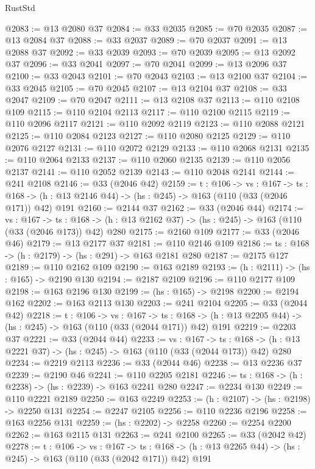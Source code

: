 \begin{lexlean}{RustStd}
\begin{coremodule}
@2083 := @13 @2080 @37
@2084 := @33 @2035
@2085 := @70 @2035
@2087 := @13 @2084 @37
@2088 := @33 @2037
@2089 := @70 @2037
@2091 := @13 @2088 @37
@2092 := @33 @2039
@2093 := @70 @2039
@2095 := @13 @2092 @37
@2096 := @33 @2041
@2097 := @70 @2041
@2099 := @13 @2096 @37
@2100 := @33 @2043
@2101 := @70 @2043
@2103 := @13 @2100 @37
@2104 := @33 @2045
@2105 := @70 @2045
@2107 := @13 @2104 @37
@2108 := @33 @2047
@2109 := @70 @2047
@2111 := @13 @2108 @37
@2113 := @110 @2108 @109
@2115 := @110 @2104 @2113
@2117 := @110 @2100 @2115
@2119 := @110 @2096 @2117
@2121 := @110 @2092 @2119
@2123 := @110 @2088 @2121
@2125 := @110 @2084 @2123
@2127 := @110 @2080 @2125
@2129 := @110 @2076 @2127
@2131 := @110 @2072 @2129
@2133 := @110 @2068 @2131
@2135 := @110 @2064 @2133
@2137 := @110 @2060 @2135
@2139 := @110 @2056 @2137
@2141 := @110 @2052 @2139
@2143 := @110 @2048 @2141
@2144 := @241 @2108
@2146 := @33 (@2046 @42)
@2159 := {t : @106} ->
  {vs : @167} ->
  {ts : @168} -> (h : @13 @2146 @44) -> (hs : @245) -> @163 (@110 (@33 (@2046 @171)) @42) @191
@2160 := @2144 @37
@2162 := @33 (@2046 @44)
@2174 := {vs : @167} ->
  {ts : @168} -> (h : @13 @2162 @37) -> (hs : @245) -> @163 (@110 (@33 (@2046 @173)) @42) @280
@2175 := @2160 @109
@2177 := @33 (@2046 @46)
@2179 := @13 @2177 @37
@2181 := @110 @2146 @109
@2186 := {ts : @168} -> (h : @2179) -> (hs : @291) -> @163 @2181 @280
@2187 := @2175 @127
@2189 := @110 @2162 @109
@2190 := @163 @2189
@2193 := (h : @2111) -> (hs : @165) -> @2190 @130
@2194 := @2187 @2109
@2196 := @110 @2177 @109
@2198 := @163 @2196 @130
@2199 := (hs : @165) -> @2198
@2200 := @2194 @162
@2202 := @163 @2113 @130
@2203 := @241 @2104
@2205 := @33 (@2044 @42)
@2218 := {t : @106} ->
  {vs : @167} ->
  {ts : @168} -> (h : @13 @2205 @44) -> (hs : @245) -> @163 (@110 (@33 (@2044 @171)) @42) @191
@2219 := @2203 @37
@2221 := @33 (@2044 @44)
@2233 := {vs : @167} ->
  {ts : @168} -> (h : @13 @2221 @37) -> (hs : @245) -> @163 (@110 (@33 (@2044 @173)) @42) @280
@2234 := @2219 @2113
@2236 := @33 (@2044 @46)
@2238 := @13 @2236 @37
@2239 := @2190 @46
@2241 := @110 @2205 @2181
@2246 := {ts : @168} -> (h : @2238) -> (hs : @2239) -> @163 @2241 @280
@2247 := @2234 @130
@2249 := @110 @2221 @2189
@2250 := @163 @2249
@2253 := (h : @2107) -> (hs : @2198) -> @2250 @131
@2254 := @2247 @2105
@2256 := @110 @2236 @2196
@2258 := @163 @2256 @131
@2259 := (hs : @2202) -> @2258
@2260 := @2254 @2200
@2262 := @163 @2115 @131
@2263 := @241 @2100
@2265 := @33 (@2042 @42)
@2278 := {t : @106} ->
  {vs : @167} ->
  {ts : @168} -> (h : @13 @2265 @44) -> (hs : @245) -> @163 (@110 (@33 (@2042 @171)) @42) @191

\end{coremodule}
\end{lexlean}
